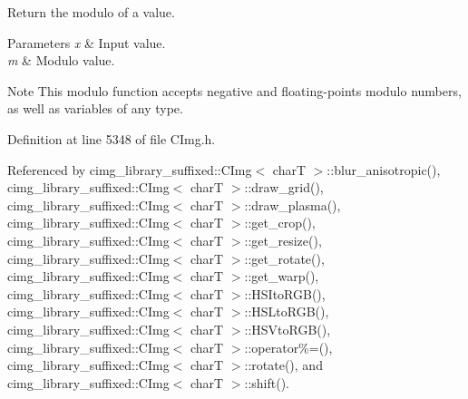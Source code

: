 Return the modulo of a value. 


\begin{DoxyParams}{Parameters}
{\em x} & Input value. \\
\hline
{\em m} & Modulo value. \\
\hline
\end{DoxyParams}
\begin{DoxyNote}{Note}
This modulo function accepts negative and floating-\/points modulo numbers, as well as variables of any type. 
\end{DoxyNote}


Definition at line 5348 of file C\+Img.\+h.



Referenced by cimg\+\_\+library\+\_\+suffixed\+::\+C\+Img$<$ char\+T $>$\+::blur\+\_\+anisotropic(), cimg\+\_\+library\+\_\+suffixed\+::\+C\+Img$<$ char\+T $>$\+::draw\+\_\+grid(), cimg\+\_\+library\+\_\+suffixed\+::\+C\+Img$<$ char\+T $>$\+::draw\+\_\+plasma(), cimg\+\_\+library\+\_\+suffixed\+::\+C\+Img$<$ char\+T $>$\+::get\+\_\+crop(), cimg\+\_\+library\+\_\+suffixed\+::\+C\+Img$<$ char\+T $>$\+::get\+\_\+resize(), cimg\+\_\+library\+\_\+suffixed\+::\+C\+Img$<$ char\+T $>$\+::get\+\_\+rotate(), cimg\+\_\+library\+\_\+suffixed\+::\+C\+Img$<$ char\+T $>$\+::get\+\_\+warp(), cimg\+\_\+library\+\_\+suffixed\+::\+C\+Img$<$ char\+T $>$\+::\+H\+S\+Ito\+R\+G\+B(), cimg\+\_\+library\+\_\+suffixed\+::\+C\+Img$<$ char\+T $>$\+::\+H\+S\+Lto\+R\+G\+B(), cimg\+\_\+library\+\_\+suffixed\+::\+C\+Img$<$ char\+T $>$\+::\+H\+S\+Vto\+R\+G\+B(), cimg\+\_\+library\+\_\+suffixed\+::\+C\+Img$<$ char\+T $>$\+::operator\%=(), cimg\+\_\+library\+\_\+suffixed\+::\+C\+Img$<$ char\+T $>$\+::rotate(), and cimg\+\_\+library\+\_\+suffixed\+::\+C\+Img$<$ char\+T $>$\+::shift().

